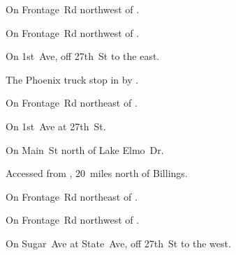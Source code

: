 

\begin{LocationList}

On Frontage~Rd northwest of  .

On Frontage~Rd northwest of  .

On 1st~Ave, off  27th~St to the east.

The Phoenix truck stop in  by  .

\Location{\GarageHQ \Garage}
On Frontage~Rd northeast of  .

On 1st~Ave at  27th~St.

On  Main~St north of Lake Elmo~Dr.

Accessed from , 20~miles north of Billings.

On Frontage~Rd northeast of  .

On Frontage~Rd northwest of  .

On Sugar~Ave at State~Ave, off  27th~St to the west.

\end{LocationList}
